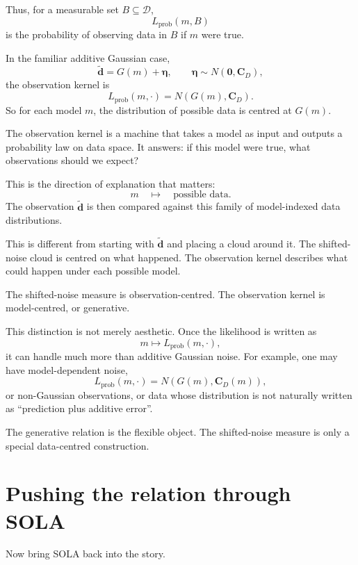 \documentclass[11pt,openany]{book}
\theoremstyle{definition}
\theoremstyle{remark}
\newcommand{\D}{\mathcal D}
\begin{document}
Thus, for a measurable set \(B\subseteq\D\),
\[
  L_{\mathrm{prob}}(m,B)
\]
is the probability of observing data in \(B\) if \(m\) were true.

In the familiar additive Gaussian case,
\[
  \widetilde{\mathbf d}
  =
  G(m)+\boldsymbol\eta,
  \qquad
  \boldsymbol\eta\sim N(\mathbf 0,\mathbf C_D),
\]
the observation kernel is
\[
  L_{\mathrm{prob}}(m,\cdot)
  =
  N(G(m),\mathbf C_D).
\]
So for each model \(m\), the distribution of possible data is centred at \(G(m)\).

\begin{intuitionbox}
The observation kernel is a machine that takes a model as input and outputs a probability law on
data space. It answers: if this model were true, what observations should we expect?
\end{intuitionbox}

This is the direction of explanation that matters:
\[
  m
  \quad\longmapsto\quad
  \text{possible data}.
\]
The observation \(\widetilde{\mathbf d}\) is then compared against this family of model-indexed
data distributions.

This is different from starting with \(\widetilde{\mathbf d}\) and placing a cloud around it. The
shifted-noise cloud is centred on what happened. The observation kernel describes what could
happen under each possible model.

\begin{checkpointbox}
The shifted-noise measure is observation-centred. The observation kernel is model-centred, or
generative.
\end{checkpointbox}

This distinction is not merely aesthetic. Once the likelihood is written as
\[
  m\mapsto L_{\mathrm{prob}}(m,\cdot),
\]
it can handle much more than additive Gaussian noise. For example, one may have
model-dependent noise,
\[
  L_{\mathrm{prob}}(m,\cdot)
  =
  N(G(m),\mathbf C_D(m)),
\]
or non-Gaussian observations, or data whose distribution is not naturally written as
``prediction plus additive error''.

The generative relation is the flexible object. The shifted-noise measure is only a special
data-centred construction.

\section{Pushing the relation through SOLA}

Now bring SOLA back into the story.
\end{document}
